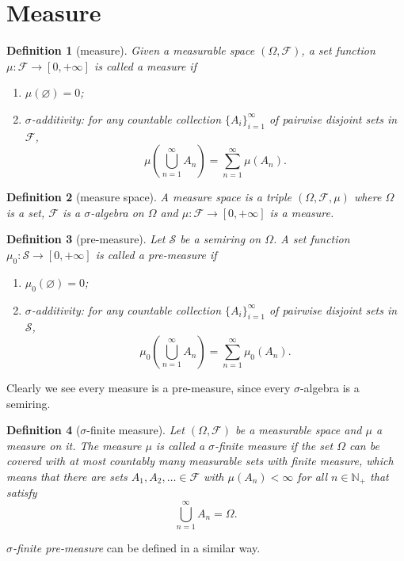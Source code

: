 \documentclass{report}
\newtheorem{definition}{Definition}[section]
\theoremstyle{nonumberplain}
\begin{document}
\section{Measure}
\begin{definition}[measure]
	Given a measurable space $(\Omega, \mathcal{F})$, a set function $\mu:\mathcal{F}\to[0,+\infty]$ is called a \emph{measure} if
	\begin{enumerate}
	\item[(a)]$\mu(\varnothing) = 0$;
	\item[(b)]$\sigma$-additivity: for any countable collection $\{A_{i}\}_{i=1}^{\infty }$ of pairwise disjoint sets in $\mathcal{F}$,
	\[
	\mu\left(\bigcup_{n=1}^\infty A_n\right)=\sum_{n=1}^{\infty}\mu(A_n).
	\]
	\end{enumerate}
\end{definition}

\begin{definition}[measure space]
 A \emph{measure space} is a triple $(\Omega,\mathcal{F},\mu)$ where $\Omega$ is a set, $\mathcal{F}$ is a $\sigma$-algebra on $\Omega$ and $\mu:\mathcal{F}\rightarrow[0,+\infty]$ is a measure.
\end{definition} 


\begin{definition}[pre-measure]
	Let $\mathcal{S}$ be a semiring on $\Omega$. A set function $\mu_0:\mathcal{S}\to[0,+\infty]$  is called a \emph{pre-measure} if
	\begin{enumerate}
		\item[(a)]$\mu_0(\varnothing) = 0$;
		\item[(b)]$\sigma$-additivity: for any countable collection $\{A_{i}\}_{i=1}^{\infty }$ of pairwise disjoint sets in $\mathcal{S}$,
		\[
		\mu_0\left(\bigcup_{n=1}^\infty A_n\right)=\sum_{n=1}^{\infty}\mu_0(A_n).
		\]
	\end{enumerate}
\end{definition}

Clearly we see every measure is a pre-measure, since every $\sigma$-algebra is a semiring.

\begin{definition}[$\sigma$-finite measure]
	Let $(\Omega,{\mathcal {F}})$ be a measurable space and $\mu$ a measure on it. The measure $\mu$ is called a \emph{$\sigma$-finite measure} if the set $\Omega$ can be covered with at most countably many measurable sets with finite measure, which means that there are sets $A_{1},A_{2},\ldots \in {\mathcal {F}}$ with $\mu \left(A_{n}\right)<\infty$ for all $n\in \mathbb {N_+}$ that satisfy 
	\[
	\bigcup_{n=1}^{\infty}A_{n}=\Omega.
	\]
\end{definition}
\emph{$\sigma$-finite pre-measure} can be defined in a similar way. 
\end{document}
